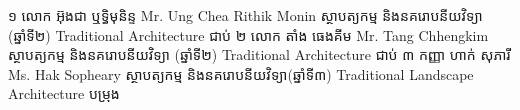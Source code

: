 \RUFAResultRow
  {១}
  {លោក អ៊ុងជា ឬទ្ធិមុនិន្ទ}
  {Mr. Ung Chea Rithik Monin}
  {ស្ថាបត្យកម្ម និងនគរោបនីយវិទ្យា (ឆ្នាំទី២)}
  {Traditional Architecture}
  {ជាប់}
\RUFAResultRow
  {២}
  {លោក តាំង ធេងគីម}
  {Mr. Tang Chhengkim}
  {ស្ថាបត្យកម្ម និងនគរោបនីយវិទ្យា (ឆ្នាំទី២)}
  {Traditional Architecture}
  {ជាប់}
\RUFAResultRow
  {៣}
  {កញ្ញា ហាក់ សុភារី}
  {Ms. Hak Sopheary}
  {ស្ថាបត្យកម្ម និងនគរោបនីយវិទ្យា(ឆ្នាំទី៣)}
  {Traditional Landscape Architecture}
  {បម្រុង}%
